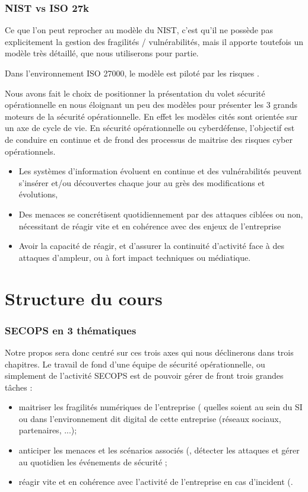 \begin{frame}
\frametitle<presentation>{NIST vs ISO 27k}
Ce que l'on peut reprocher au modèle du NIST, c'est qu'il ne possède pas explicitement la gestion des fragilités / vulnérabilités, mais il apporte toutefois un modèle très détaillé, que nous utiliserons pour partie.
\end{frame}
Dans l'environnement ISO 27000, le modèle est piloté par les risques .

Nous avons fait le choix de positionner la présentation du volet sécurité opérationnelle en nous éloignant un peu des modèles pour présenter les 3 grands moteurs de la sécurité opérationnelle. En effet les modèles cités sont orientée sur un axe de cycle de vie.
En sécurité opérationnelle ou cyberdéfense, l'objectif est de conduire en continue et de frond des processus de maitrise des risques cyber opérationnels.
\begin{itemize}
  \item Les systèmes d'information évoluent en continue et des vulnérabilités peuvent s'insérer et/ou découvertes chaque jour au grès des modifications et évolutions,
  \item Des menaces se concrétisent quotidiennement par des attaques ciblées ou non, nécessitant de réagir vite et en cohérence avec des enjeux de l'entreprise
  \item Avoir la capacité de réagir, et d'assurer la continuité d'activité face à des attaques d'ampleur, ou à fort impact techniques ou médiatique.
\end{itemize}

\newpage
\section{Structure du cours}


\begin{frame}
\frametitle<presentation>{SECOPS en 3 thématiques}
Notre propos sera donc centré sur ces trois axes  qui nous déclinerons dans trois chapitres. Le travail de fond d'une équipe de sécurité opérationnelle, ou simplement de l'activité SECOPS est de pouvoir gérer de front trois grandes tâches : 
\begin{itemize}
 \item maitriser les fragilités numériques de l'entreprise ( quelles soient au sein du SI ou dans l'environnement dit digital de cette entreprise (réseaux sociaux, partenaires, ...);
 \item anticiper les menaces et les scénarios associés (, détecter les attaques et gérer au quotidien les événements de sécurité ;
 \item réagir vite et en cohérence avec l'activité de l'entreprise en cas d'incident (.
\end{itemize}
\end{frame}


